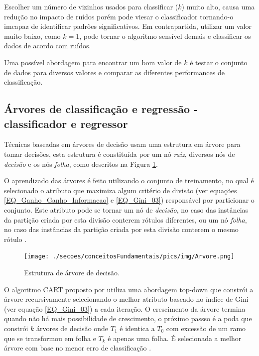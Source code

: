 Escolher um número de vizinhos usados para classificar (\(k\)) muito alto, causa uma redução no impacto de ruídos porém pode viesar o classificador tornando-o imcapaz de identificar padrões significativos. Em contrapartida, utilizar um valor  muito baixo, como \(k = 1\), pode tornar o algoritmo sensível demais e classificar os dados de acordo com ruídos.

Uma possível abordagem para encontrar um bom valor de \(k\) é testar o conjunto de dados para diversos valores e comparar as diferentes performances de classificação.

\subsection{Árvores de classificação e regressão - classificador e regressor}
Técnicas baseadas em árvores de decisão usam uma estrutura em árvore para tomar decisões, esta estrutura é constituída por um nó \emph{raiz}, diversos nós de \emph{decisão} e os nós \emph{folha}, como descritos na Figura \ref{FIGURA_ARVORE_DECISAO}. 

O aprendizado das árvores é feito utilizando o conjunto de treinamento, no qual é selecionado o atributo que maximiza algum critério de divisão (ver equações \eqref{EQ_Ganho_Ganho_Informacao} e \eqref{EQ_Gini_03}) responsável por particionar o conjunto. Este atributo pode se tornar um nó de \emph{decisão}, no caso das instâncias da partição criada por esta divisão conterem rótulos diferentes, ou um nó \emph{folha}, no caso das instâncias da partição criada por esta divisão conterem o mesmo rótulo \cite{HanKamber2011}.
\begin{figure}[H]
	\centering
 	  \caption{Estrutura de árvore de decisão.}
		\texttt{[image: ./secoes/conceitosFundamentais/pics/img/Arvore.png]}
	\label{FIGURA_ARVORE_DECISAO}
\end{figure}

O algoritmo CART proposto por  utiliza uma abordagem top-down que constrói a árvore recursivamente selecionando o melhor atributo baseado no índice de Gini (ver equação \eqref{EQ_Gini_03}) a cada iteração. O crescimento da árvore termina quando não há mais possibilidade de crescimento, o próximo passso é a poda que constrói \(k\) árvores de decisão onde \(T_{1}\) é identica a \(T_{0}\) com excessão de um ramo que se transformou em folha e \(T_{k}\) é apenas uma folha. É selecionada a melhor árvore com base no menor erro de classificação \cite{Breiman1984}. 

